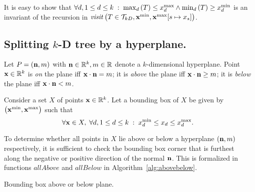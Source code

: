 It is easy to show that $\forall d, 1 \leq d \leq k \;:\; \treemax[d]{T} \leq \xcmax{d} \AND \treemin[d]{T} \geq \xcmin{d}$
  is an invariant of the recursion in $\mathit{visit} \left( T \in \kdtrees, \xmin, \xmax[s \mapsto x_s] \right)$.


\subsection{Splitting $k$-D tree by a hyperplane.}
\label{sec:splitplane}
Let $P = \left( \vc{n}, m \right)$ with $\vc{n} \in \Real^k, m \in \Real$ denote a $k$-dimensional hyperplane.
Point $\vc{x} \in \Real^k$ is \emph{on} the plane iff $\vc{x}\cdot\vc{n} = m$;
it is \emph{above} the plane iff $\vc{x}\cdot\vc{n} \geq m$;
it is \emph{below} the plane iff $\vc{x}\cdot\vc{n} < m$.

Consider a set $X$ of points $\vc{x} \in \Real^k$.
Let a bounding box of $X$ be given by $\left( \xmin, \xmax \right)$ such that
\begin{displaymath}
  \forall \vc{x} \in X, \; \forall d, 1 \leq d \leq k \;:\; \xcmin{d} \leq x_d \leq \xcmax{d}.
\end{displaymath}

To determine whether all points in $X$ lie above or below a hyperplane $\left( \vc{n}, m \right)$ respectively,
it is sufficient to check the bounding box corner that is furthest along the negative or positive direction of the normal $\vc{n}$.
This is formalized in functions $\mathit{allAbove}$ and $\mathit{allBelow}$ in Algorithm~\ref{alg:abovebelow}.

\begin{algorithm}[h]
  \DontPrintSemicolon
  \BlankLine
  \BlankLine
  \caption{Bounding box above or below plane.}
  \label{alg:abovebelow}
\end{algorithm}

